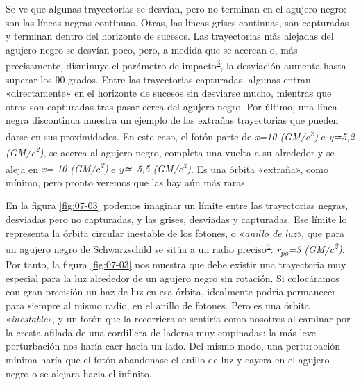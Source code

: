 Se ve que algunas trayectorias se desvían, pero no terminan en el agujero negro: son las líneas negras continuas. Otras, las líneas grises continuas, son capturadas y terminan dentro del horizonte de sucesos. Las trayectorias más alejadas del agujero negro se desvían poco, pero, a medida que se acercan o, más precisamente, disminuye el parámetro de impacto\textsuperscript{\hyperlink{note:07-03}{3}}, la desviación aumenta hasta superar los 90 grados. Entre las trayectorias capturadas, algunas entran «directamente» en el horizonte de sucesos sin desviarse mucho, mientras que otras son capturadas tras pasar cerca del agujero negro. Por último, una línea negra discontinua muestra un ejemplo de las extrañas trayectorias que pueden darse en sus proximidades. En este caso, el fotón parte de \emph{x=10 (GM/c\textsuperscript{2})} e \emph{y≃5,2 (GM/c\textsuperscript{2})}, se acerca al agujero negro, completa una vuelta a su alrededor y se aleja en \emph{x=-10 (GM/c\textsuperscript{2})} e \emph{y≃--5,5 (GM/c\textsuperscript{2})}. Es una órbita «extraña», como mínimo, pero pronto veremos que las hay aún más raras.

En la figura \ref{fig:07-03} podemos imaginar un límite entre las trayectorias negras, desviadas pero no capturadas, y las grises, desviadas y capturadas. Ese límite lo representa la órbita circular inestable de los fotones, o «\emph{anillo de luz}», que para un agujero negro de Schwarzschild se sitúa a un radio preciso\textsuperscript{\hyperlink{note:07-04}{4}}: \emph{r\textsubscript{po}=3 (GM/c\textsuperscript{2})}. Por tanto, la figura \ref{fig:07-03} nos muestra que debe existir una trayectoria muy especial para la luz alrededor de un agujero negro sin rotación. Si colocáramos con gran precisión un haz de luz en esa órbita, idealmente podría permanecer para siempre al mismo radio, en el anillo de fotones. Pero es una órbita «\emph{inestable}», y un fotón que la recorriera se sentiría como nosotros al caminar por la cresta afilada de una cordillera de laderas muy empinadas: la más leve perturbación nos haría caer hacia un lado. Del mismo modo, una perturbación mínima haría que el fotón abandonase el anillo de luz y cayera en el agujero negro o se alejara hacia el infinito.

